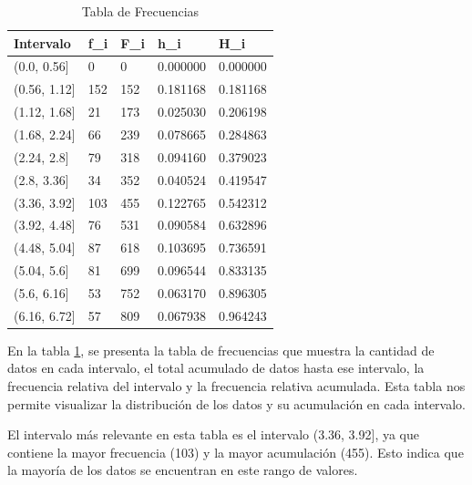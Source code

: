 \begin{table}[h]
    \centering
    \caption{Tabla de Frecuencias}
    \begin{tabular}{lllll}
        \hline
        \textbf{Intervalo} & \textbf{f\_i} & \textbf{F\_i} & \textbf{h\_i} & \textbf{H\_i} \\
        \hline
        (0.0, 0.56]        & 0             & 0             & 0.000000      & 0.000000      \\
        (0.56, 1.12]       & 152           & 152           & 0.181168      & 0.181168      \\
        (1.12, 1.68]       & 21            & 173           & 0.025030      & 0.206198      \\
        (1.68, 2.24]       & 66            & 239           & 0.078665      & 0.284863      \\
        (2.24, 2.8]        & 79            & 318           & 0.094160      & 0.379023      \\
        (2.8, 3.36]        & 34            & 352           & 0.040524      & 0.419547      \\
        (3.36, 3.92]       & 103           & 455           & 0.122765      & 0.542312      \\
        (3.92, 4.48]       & 76            & 531           & 0.090584      & 0.632896      \\
        (4.48, 5.04]       & 87            & 618           & 0.103695      & 0.736591      \\
        (5.04, 5.6]        & 81            & 699           & 0.096544      & 0.833135      \\
        (5.6, 6.16]        & 53            & 752           & 0.063170      & 0.896305      \\
        (6.16, 6.72]       & 57            & 809           & 0.067938      & 0.964243      \\
        \hline
    \end{tabular}%
    \label{tab:tabla_frecuencias}%
\end{table}%

En la tabla \ref{tab:tabla_frecuencias}, se presenta la tabla de frecuencias que muestra la cantidad de datos en cada intervalo, el total acumulado de datos hasta ese intervalo, la frecuencia relativa del intervalo y la frecuencia
relativa acumulada. Esta tabla nos permite visualizar la distribución de los datos y su acumulación en cada intervalo.

El intervalo más relevante en esta tabla es el intervalo (3.36, 3.92], ya que contiene la mayor frecuencia (103) y la mayor acumulación (455). Esto indica que la mayoría de los datos se encuentran en este rango de valores.

